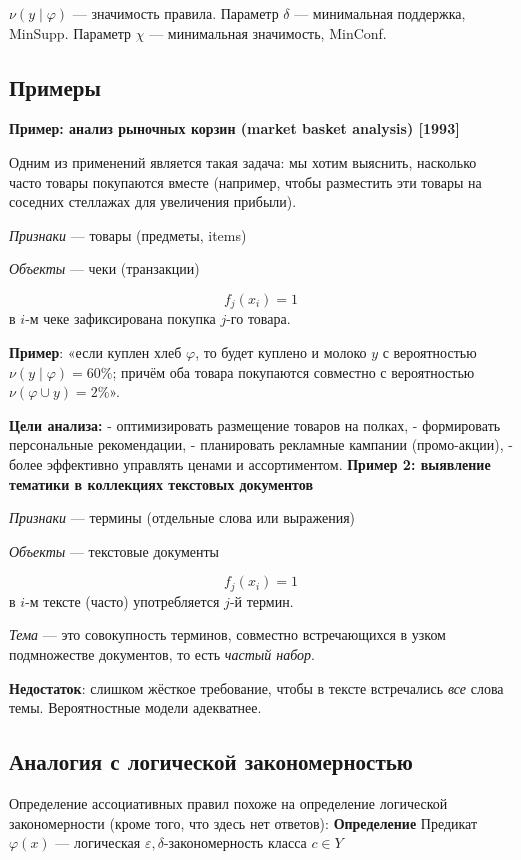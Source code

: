 $\nu(y \mid \varphi)$ — значимость правила.
Параметр $\delta$ — минимальная поддержка, MinSupp.
Параметр $\chi$ — минимальная значимость, MinConf.

\subsection{Примеры}
\textbf{Пример: анализ рыночных корзин (market basket analysis) [1993]}

Одним из применений является такая задача: мы хотим выяснить, насколько часто товары покупаются вместе (например, чтобы разместить эти товары на соседних стеллажах для увеличения прибыли).

\textit{Признаки} — товары (предметы, items)

\textit{Объекты} — чеки (транзакции)

\[ f_j(x_i) = 1 \] 
в \( i \)-м чеке зафиксирована покупка \( j \)-го товара.

\textbf{Пример}: «если куплен хлеб \(\varphi\), то будет куплено и молоко \(y\) с вероятностью \(\nu(y \mid \varphi) = 60\%\); причём оба товара покупаются совместно с вероятностью \(\nu(\varphi \cup y) = 2\%\)».

\textbf{Цели анализа:}
- оптимизировать размещение товаров на полках,
- формировать персональные рекомендации,
- планировать рекламные кампании (промо-акции),
- более эффективно управлять ценами и ассортиментом.
\newline
\newline
\textbf{Пример 2: выявление тематики в коллекциях текстовых документов}

\textit{Признаки} — термины (отдельные слова или выражения)

\textit{Объекты} — текстовые документы

\[ f_j(x_i) = 1 \]
в \( i \)-м тексте (часто) употребляется \( j \)-й термин.

\textit{Тема} — это совокупность терминов, совместно встречающихся в узком подмножестве документов, то есть \textit{частый набор}.

\textbf{Недостаток}: слишком жёсткое требование, чтобы в тексте встречались \textit{все} слова темы. Вероятностные модели адекватнее.

\subsection{Аналогия с логической закономерностью}
Определение ассоциативных правил похоже на определение логической закономерности (кроме того, что здесь нет ответов):
\newline
\textbf{Определение}
\newline
Предикат \(\varphi(x)\) — логическая \(\varepsilon, \delta\)-закономерность класса \(c \in Y\)

